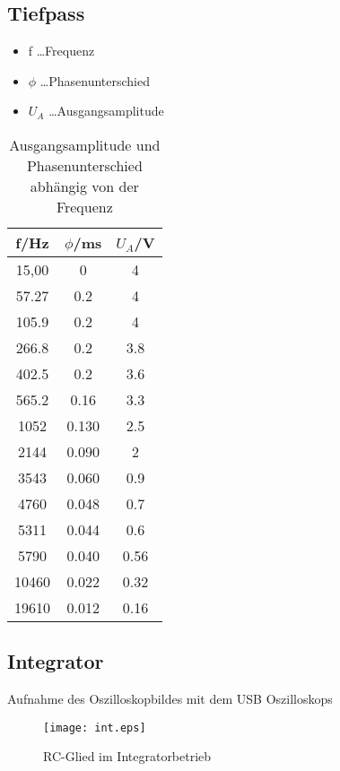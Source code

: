 \documentclass[a4paper]{article}
\begin{document}
\subsection{Tiefpass}
\begin{table}[ht]
  \centering
  \caption{Ausgangsamplitude und Phasenunterschied abhängig von der Frequenz}
  \begin{itemize}
    \item f \dots Frequenz
    \item $\phi$ \dots Phasenunterschied
    \item $U_A$ \dots Ausgangsamplitude
  \end{itemize}
  \begin{tabular}{|c|c|c|}
    \hline
    f/Hz&$\phi$/ms&$U_A$/V\\
    \hline
    15,00&0&4\\
    \hline
    57.27&0.2&4\\
    \hline
    105.9&0.2&4\\
    \hline
    266.8&0.2&3.8\\
    \hline
    402.5&0.2&3.6\\
    \hline
    565.2&0.16&3.3\\
    \hline
    1052&0.130&2.5\\
    \hline
    2144&0.090&2\\
    \hline
    3543&0.060&0.9\\
    \hline
    4760&0.048&0.7\\
    \hline
    5311&0.044&0.6\\
    \hline
    5790&0.040&0.56\\
    \hline
    10460&0.022&0.32\\
    \hline
    19610&0.012&0.16\\
    \hline
  \end{tabular}
  \label{tab:2}
\end{table}



\newpage
\subsection{Integrator}

Aufnahme des Oszilloskopbildes mit dem USB Oszilloskops
\begin{figure}[ht]
\begin{center}
  \texttt{[image: int.eps]}
\end{center}
\caption{RC-Glied im Integratorbetrieb}
\label{fig:5}
\end{figure}
\end{document}
